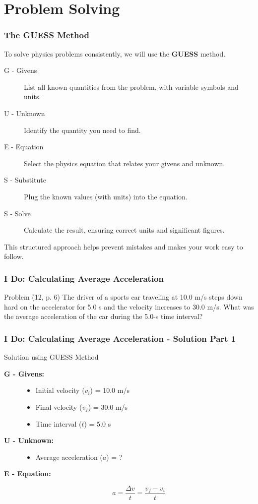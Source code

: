 \documentclass{beamer}
\begin{document}
\section{Problem Solving}

\begin{frame}
\frametitle{The GUESS Method}
To solve physics problems consistently, we will use the \textbf{GUESS} method.
\begin{description}
    \item[\alert{G} - Givens] List all known quantities from the problem, with variable symbols and units.
    \item[\alert{U} - Unknown] Identify the quantity you need to find.
    \item[\alert{E} - Equation] Select the physics equation that relates your givens and unknown.
    \item[\alert{S} - Substitute] Plug the known values (with units) into the equation.
    \item[\alert{S} - Solve] Calculate the result, ensuring correct units and significant figures.
\end{description}
This structured approach helps prevent mistakes and makes your work easy to follow.
\end{frame}

\begin{frame}
\frametitle{I Do: Calculating Average Acceleration}
\begin{block}{Problem (12, p. 6)}
The driver of a sports car traveling at 10.0 m/s steps down hard on the accelerator for 5.0 s and the velocity increases to 30.0 m/s. What was the average acceleration of the car during the 5.0-s time interval?
\end{block}
\end{frame}

\begin{frame}
\frametitle{I Do: Calculating Average Acceleration - Solution Part 1}
\begin{block}{Solution using GUESS Method}
\begin{description}
    \item[\textbf{G - Givens:}]
        \begin{itemize}
            \item Initial velocity ($v_i$) = 10.0 m/s
            \item Final velocity ($v_f$) = 30.0 m/s
            \item Time interval ($t$) = 5.0 s
        \end{itemize}
    \item[\textbf{U - Unknown:}]
        \begin{itemize}
            \item Average acceleration ($a$) = ?
        \end{itemize}
    \item[\textbf{E - Equation:}]
        \[ a = \frac{\Delta v}{t} = \frac{v_f - v_i}{t} \]
\end{description}
\end{block}
\end{frame}
\end{document}
